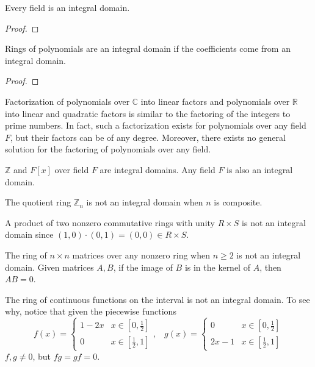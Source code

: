   \begin{theorem}
    Every field is an integral domain. 
  \end{theorem}
  \begin{proof}
    
  \end{proof}

  \begin{theorem}
    Rings of polynomials are an integral domain if the coefficients come from an integral domain. 
  \end{theorem}
  \begin{proof}
    
  \end{proof} 

  Factorization of polynomials over $\mathbb{C}$ into linear factors and polynomials over $\mathbb{R}$ into linear and quadratic factors is similar to the factoring of the integers to prime numbers. In fact, such a factorization exists for polynomials over any field $F$, but their factors can be of any degree. Moreover, there exists no general solution for the factoring of polynomials over any field. 

  \begin{example}
    $\mathbb{Z}$ and $F[x]$ over field $F$ are integral domains. Any field $F$ is also an integral domain. 
  \end{example}

  \begin{example}
    The quotient ring $\mathbb{Z}_n$ is not an integral domain when $n$ is composite. 
  \end{example}

  \begin{example}
    A product of two nonzero commutative rings with unity $R \times S$ is not an integral domain since $(1,0) \cdot (0, 1) = (0, 0) \in R \times S$. 
  \end{example}

  \begin{example}
    The ring of $n \times n$ matrices over any nonzero ring when $ n \geq 2$ is not an integral domain. Given matrices $A, B$, if the image of $B$ is in the kernel of $A$, then $A B = 0$.
  \end{example}

  \begin{example}
    The ring of continuous functions on the interval is not an integral domain. To see why, notice that given the piecewise functions 
    \begin{equation}
      f (x) = \begin{cases}
      1 - 2x & x \in [0, \frac{1}{2}] \\
      0 & x \in [\frac{1}{2}, 1] 
      \end{cases}, \; \;\;g (x) = \begin{cases}
      0 & x \in [0, \frac{1}{2}] \\
      2x - 1 & x \in [\frac{1}{2}, 1] 
      \end{cases}
    \end{equation}
    $f, g \neq 0$, but $f g = g f = 0$. 
  \end{example}

